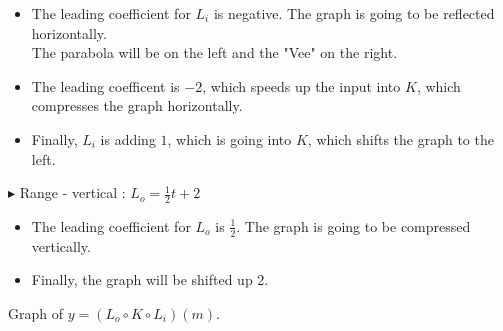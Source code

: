 \documentclass{ximera}
\begin{document}
\begin{itemize}
\item The leading coefficient for $L_i$ is negative.  The graph is going to be reflected horizontally. \\
The parabola will be on the left and the "Vee" on the right.
\item The leading coefficent is $-2$, which speeds up the input into $K$, which compresses the graph horizontally.
\item Finally, $L_i$ is adding $1$, which is going into $K$, which shifts the graph to the left.

\end{itemize}





$\blacktriangleright$ Range - vertical : $L_o = \frac{1}{2}t + 2$


\begin{itemize}
\item The leading coefficient for $L_o$ is $\frac{1}{2}$.  The graph is going to be compressed vertically. \\
\item Finally, the graph will be shifted up $2$.

\end{itemize}


Graph of $ y = (L_o \circ K \circ L_i)(m)$.
\end{document}
